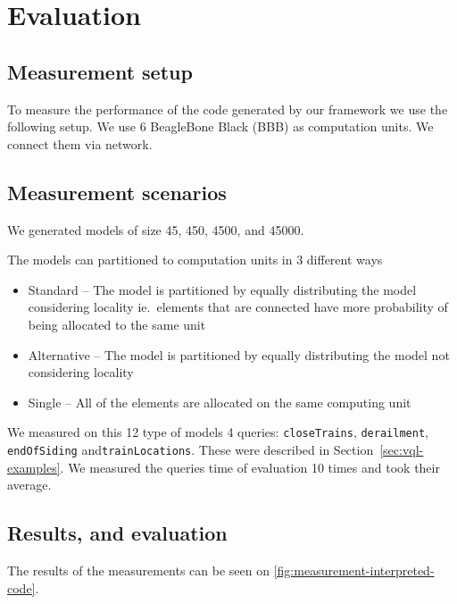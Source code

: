 
\chapter{Evaluation}


\section{Measurement setup}

To measure the performance of the code generated by our framework we use the following setup. We use 6 BeagleBone Black (BBB) \cite{BBB} as computation units. We connect them via network. 


\section{Measurement scenarios}

We generated models of size 45, 450, 4500, and 45000.

The models can partitioned to computation units in 3 different ways 
\begin{itemize}
	\item Standard -- The model is partitioned by equally distributing the model considering locality ie.\ elements that are connected have more probability of being allocated to the same unit
	\item Alternative -- The model is partitioned by equally distributing the model not considering locality
	\item Single -- All of the elements are allocated on the same computing unit
\end{itemize}

We measured on this 12 type of models 4 queries: \texttt{closeTrains}, \texttt{derailment}, \texttt{endOfSiding} and\texttt{trainLocations}. 
These were described in Section~\ref{sec:vql-examples}.
We measured the queries time of evaluation 10 times and took their average.

\pagebreak

\section{Results, and evaluation}

The results of the measurements can be seen on \autoref{fig:measurement-interpreted-code}.

